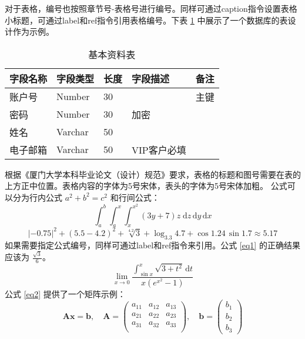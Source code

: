 \documentclass{xmu}
\begin{document}
对于表格，编号也按照章节号-表格号进行编号。同样可通过caption指令设置表格小标题，可通过label和ref指令引用表格编号。下表 \ref{database} 中展示了一个数据库的表设计作为示例。
\begin{table}[!htb]
    \centering
    \caption{基本资料表}
    \label{database}
    \songti{}
    \begin{tabular}{|l|l|l|l|l|}
        \hline
        \textbf{字段名称} & \textbf{字段类型} & \textbf{长度} & \textbf{字段描述} & \textbf{备注} \\ \hline
        账户号           & Number        & 30          &               & 主键          \\ \hline
        密码            & Number        & 30          & 加密            &             \\ \hline
        姓名            & Varchar       & 50          &               &             \\ \hline
        电子邮箱          & Varchar       & 50          & VIP客户必填       &             \\ \hline
    \end{tabular}
\end{table}
根据《厦门大学本科毕业论文（设计）规范》\cite{xmuthesis}要求，表格的标题和图号需要在表的上方正中位置。表格内容的字体为5号宋体，表头的字体为5号宋体加粗。
公式可以分为行内公式 $a^2+b^2=c^2$ 和行间公式：
$$
    \int_a^b\int_a^x\int_x^{x^2}(3y+7)z\;\mathrm{d}z\,\mathrm{d}y\,\mathrm{d}x
$$
$$
    |-0.75|^{2}+(5.5-4.2)^2+\sqrt[4.2]{3}+\log_{3.3}{4.7}+\cos1.24\,\sin1.7\approx5.17
$$
如果需要指定公式编号，同样可通过label和ref指令来引用。公式 \ref{eq1} 的正确结果应该为 $\frac{\sqrt{3}}{6}$。
\begin{equation}\label{eq1}
    \lim_{x\to0}\frac{\displaystyle{\int_{\sin x}^x\sqrt{3+t^2}\,\mathrm{d}t}}{x(e^{x^2}-1)}
\end{equation}
公式 \ref{eq2} 提供了一个矩阵示例：
\begin{equation}\label{eq2}
    \bm{Ax} = \bm{b},\quad\bm{A} = \left(\begin{array}{ccc}
            a_{11} & a_{12} & a_{13} \\
            a_{21} & a_{22} & a_{23} \\
            a_{31} & a_{32} & a_{33} \\
        \end{array}\right),\quad \bm{b}=\left(\begin{array}{c}
            b_1 \\ b_2 \\ b_3\end{array}\right)
\end{equation}
\end{document}
